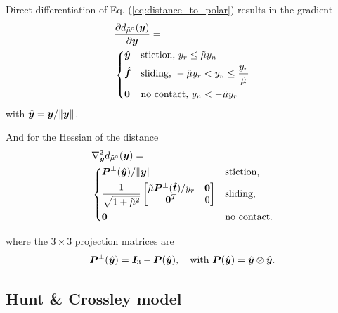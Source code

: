 Direct differentiation of Eq. (\ref{eq:distance_to_polar}) results in the
gradient
\begin{align}
	&\frac{\partial{d_{\tilde{\mu}^\circ}(\vf{y})}}{\partial\vf{y}} = 
	\label{eq:gradient_distance_to_polar}\\
&\begin{dcases}
	\hat{\vf{y}} & \text{stiction, } y_r \le \tilde\mu y_n\\
	\hat{\vf{f}} & \text{sliding, } -\tilde\mu y_r < y_n \leq \frac{y_r}{\tilde\mu}\\
    \vf{0} & \text{no contact, } y_n < -\tilde\mu y_r
\end{dcases}\nonumber
\end{align}
with $\hat{{\bm{y}}}={\bm{y}}/\Vert{\bm{y}}\Vert$.

And for the Hessian of the distance
\begin{align}
	&\nabla_\vf{y}^2 d_{\tilde{\mu}^\circ}(\vf{y}) = 
	\label{eq:hessian_distance_to_polar}\\
&\begin{dcases}
	\vf{P}^\perp(\hat{\vf{y}})/\Vert\vf{y}\Vert & 
	\text{stiction,}\\
	\frac{1}{\sqrt{1+\tilde\mu^2}}
	\begin{bmatrix}
		\tilde\mu\vf{P}^\perp(\hat{\vf{t}})/y_r & 
		\vf{0}\\
		\vf{0}^T & 
		0\\
	\end{bmatrix} &
	\text{sliding,}\\
    \vf{0} & \text{no contact.}
\end{dcases}\nonumber
\end{align}

where the $3\times 3$ projection matrices are
\begin{equation*}
	{\bm{P}}^\perp(\hat{{\bm{y}}})={\bm{I}}_3 - {\bm{P}}(\hat{{\bm{y}}}),
	\quad\text{with }
	{\bm{P}}(\hat{{\bm{y}}}) = \hat{{\bm{y}}}\otimes\hat{{\bm{y}}}\nonumber.
\end{equation*}

\subsection{Hunt \& Crossley model}

